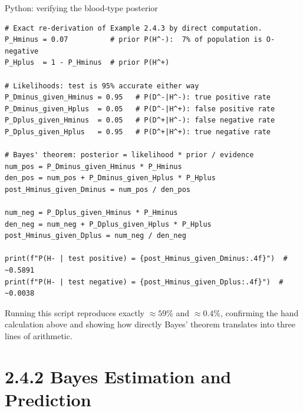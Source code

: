 \documentclass[aspectratio=169,10pt]{beamer}
\begin{document}
\begin{frame}[fragile]{Python: verifying the blood-type posterior}
  \begin{lstlisting}
# Exact re-derivation of Example 2.4.3 by direct computation.
P_Hminus = 0.07          # prior P(H^-):  7% of population is O-negative
P_Hplus  = 1 - P_Hminus  # prior P(H^+)

# Likelihoods: test is 95% accurate either way
P_Dminus_given_Hminus = 0.95   # P(D^-|H^-): true positive rate
P_Dminus_given_Hplus  = 0.05   # P(D^-|H^+): false positive rate
P_Dplus_given_Hminus  = 0.05   # P(D^+|H^-): false negative rate
P_Dplus_given_Hplus   = 0.95   # P(D^+|H^+): true negative rate

# Bayes' theorem: posterior = likelihood * prior / evidence
num_pos = P_Dminus_given_Hminus * P_Hminus
den_pos = num_pos + P_Dminus_given_Hplus * P_Hplus
post_Hminus_given_Dminus = num_pos / den_pos

num_neg = P_Dplus_given_Hminus * P_Hminus
den_neg = num_neg + P_Dplus_given_Hplus * P_Hplus
post_Hminus_given_Dplus = num_neg / den_neg

print(f"P(H- | test positive) = {post_Hminus_given_Dminus:.4f}")  # ~0.5891
print(f"P(H- | test negative) = {post_Hminus_given_Dplus:.4f}")  # ~0.0038
  \end{lstlisting}
  Running this script reproduces exactly $\approx 59\%$ and $\approx 0.4\%$,
  confirming the hand calculation above and showing how directly Bayes'
  theorem translates into three lines of arithmetic.
\end{frame}

\section{2.4.2 Bayes Estimation and Prediction}
\end{document}
